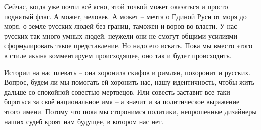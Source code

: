 Сейчас, когда уже почти всё ясно, этой точкой может оказаться и просто поднятый
флаг. А может, человек. А может – мечта о Единой Руси от моря до моря, о земле
русских людей без границ, таможен и воров во власти. У нас русских так много
умных людей, неужели они не смогут общими усилиями сформулировать такое
представление. Но надо его искать. Пока мы вместо этого в стиле акына
комментируем происходящее, оно так и будет происходить.

Истории на нас плевать – она хоронила скифов и римлян, похоронит и русских.
Вопрос, будем ли мы помогать ей хоронить нас, нашу идентичность, чтобы жить
дальше со спокойной совестью мертвецов. Или совесть заставит все-таки бороться
за своё национальное имя – а значит и за политическое выражение этого имени.
Потому что пока мы сторонимся политики, непрошенные дизайнеры наших судеб кроят
нам будущее, в котором нас нет.

